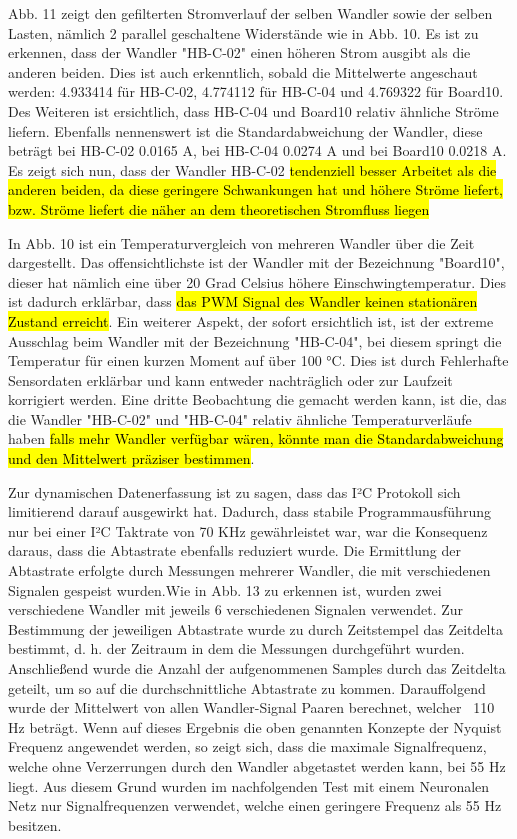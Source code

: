 \begin{flushleft}



Abb. 11 zeigt den gefilterten Stromverlauf der selben Wandler sowie der selben Lasten, nämlich 2 parallel geschaltene Widerstände wie in Abb. 10. Es ist zu erkennen, dass der Wandler "HB-C-02" einen höheren Strom ausgibt als die anderen beiden. Dies ist auch erkenntlich, sobald die Mittelwerte angeschaut werden: 4.933414 für HB-C-02, 4.774112 für HB-C-04 und 4.769322 für Board10. Des Weiteren ist ersichtlich, dass HB-C-04 und Board10 relativ ähnliche Ströme liefern. Ebenfalls nennenswert ist die Standardabweichung der Wandler, diese beträgt bei HB-C-02 0.0165 A, bei HB-C-04 0.0274 A und bei Board10 0.0218 A. Es zeigt sich nun, dass der Wandler HB-C-02 \hl{tendenziell besser Arbeitet als die anderen beiden, da diese geringere Schwankungen hat und höhere Ströme liefert, bzw. Ströme liefert die näher an dem theoretischen Stromfluss liegen}

In Abb. 10 ist ein Temperaturvergleich von mehreren Wandler über die Zeit dargestellt. Das offensichtlichste ist der Wandler mit der Bezeichnung "Board10", dieser hat nämlich eine über 20 Grad Celsius höhere Einschwingtemperatur. Dies ist dadurch erklärbar, dass \hl{das PWM Signal des Wandler keinen stationären Zustand erreicht}. Ein weiterer Aspekt, der sofort ersichtlich ist, ist der extreme Ausschlag beim Wandler mit der Bezeichnung "HB-C-04", bei diesem springt die Temperatur für einen kurzen Moment auf über 100 °C. Dies ist durch Fehlerhafte Sensordaten erklärbar und kann entweder nachträglich oder zur Laufzeit korrigiert werden. Eine dritte Beobachtung die gemacht werden kann, ist die, das die Wandler "HB-C-02" und "HB-C-04" relativ ähnliche Temperaturverläufe haben \hl{falls mehr Wandler verfügbar wären, könnte man die Standardabweichung und den Mittelwert präziser bestimmen}.

Zur dynamischen Datenerfassung ist zu sagen, dass das I²C Protokoll sich limitierend darauf ausgewirkt hat. Dadurch, dass stabile Programmausführung nur bei einer I²C Taktrate von 70 KHz gewährleistet war, war die Konsequenz daraus, dass die Abtastrate ebenfalls reduziert wurde. Die Ermittlung der Abtastrate erfolgte durch Messungen mehrerer Wandler, die mit verschiedenen Signalen gespeist wurden.Wie in Abb. 13 zu erkennen ist, wurden zwei verschiedene Wandler mit jeweils 6 verschiedenen Signalen verwendet. Zur Bestimmung der jeweiligen Abtastrate wurde zu durch Zeitstempel das Zeitdelta bestimmt, d. h. der Zeitraum in dem die Messungen durchgeführt wurden. Anschließend wurde die Anzahl der aufgenommenen Samples durch das Zeitdelta geteilt, um so auf die durchschnittliche Abtastrate zu kommen. Darauffolgend wurde der Mittelwert von allen Wandler-Signal Paaren berechnet, welcher ~110 Hz beträgt. Wenn auf dieses Ergebnis die oben genannten Konzepte der Nyquist Frequenz angewendet werden, so zeigt sich, dass die maximale Signalfrequenz, welche ohne Verzerrungen durch den Wandler abgetastet werden kann, bei 55 Hz liegt. Aus diesem Grund wurden im nachfolgenden Test mit einem Neuronalen Netz nur Signalfrequenzen verwendet, welche einen geringere Frequenz als 55 Hz besitzen. 


\end{flushleft}
